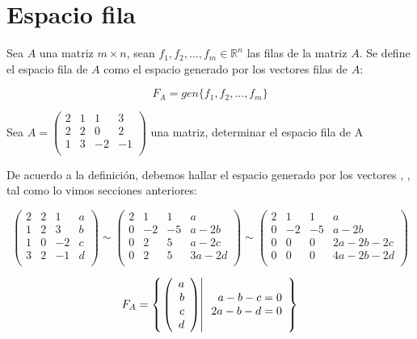 \newpage
\section{Espacio fila}
\begin{dfn}
Sea $A$ una matriz $m\times n$, sean $f_1,f_2,\ldots, f_m \in \mathbb{R}^n$ las filas de la matriz $A$. Se define el espacio fila de $A$ como el espacio generado por los vectores filas de $A$:

\[F_A=gen\{f_1, f_2, ..., f_m\}\]
\end{dfn}


\begin{ejemplo}
Sea $A=
\left(
\begin{array}{rrrr}
2&1&1&3\\
2&2&0&2\\
1&3&-2&-1\\
\end{array}
\right)$ una matriz, determinar el espacio fila de A

 
De acuerdo a la definición, debemos hallar el espacio generado por los vectores , ,  tal como lo vimos secciones anteriores:

\[
\left(
\begin{array}{rrr|r}
2&2&1&a\\
1&2&3&b\\
1&0&-2&c\\
3&2&-1&d\\
\end{array}
\right)
\sim
\left(
\begin{array}{rrr|r}
2&1&1&a\\
0&-2&-5&a-2b\\
0&2&5&a-2c\\
0&2&5&3a-2d\\
\end{array}
\right)
\sim
\left(
\begin{array}{rrr|r}
2&1&1&a\\
0&-2&-5&a-2b\\
0&0&0&2a-2b-2c\\
0&0&0&4a-2b-2d\\
\end{array}
\right)
\]

\[F_A=\llaves{\vectr4{a}{b}{c}{d}}
{\begin{array}{r}
a-b-c=0\\
2a-b-d=0\\
\end{array}}
\]

\end{ejemplo}


